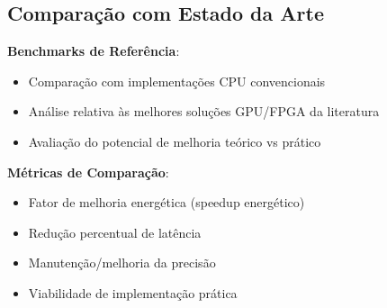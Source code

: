 \subsection{Comparação com Estado da Arte}

\textbf{Benchmarks de Referência}:
\begin{itemize}
\item Comparação com implementações CPU convencionais
\item Análise relativa às melhores soluções GPU/FPGA da literatura
\item Avaliação do potencial de melhoria teórico vs prático
\end{itemize}

\textbf{Métricas de Comparação}:
\begin{itemize}
\item Fator de melhoria energética (speedup energético)
\item Redução percentual de latência
\item Manutenção/melhoria da precisão
\item Viabilidade de implementação prática
\end{itemize}